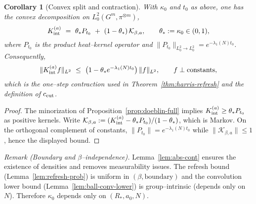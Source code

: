 \documentclass[11pt]{amsart}
\theoremstyle{plain}
\newtheorem{corollary}[theorem]{Corollary}
\theoremstyle{definition}
\theoremstyle{remark}
\begin{document}
\begin{corollary}[Convex split and contraction]\label{cor:convex-split}
With $\kappa_0$ and $t_0$ as above, one has the convex decomposition on $L^2_0(G^m,\pi^{\otimes m})$,
\[
  K_{\rm int}^{(a)}\ =\ \theta_* P_{t_0}\ +\ (1-\theta_*)\,\mathcal{K}_{\beta,a},\qquad \theta_*:=\kappa_0\in(0,1),
\]
where $P_{t_0}$ is the product heat–kernel operator and $\|P_{t_0}\|_{L^2_0\to L^2_0}=e^{-\lambda_1(N) t_0}$. Consequently,
\[
  \|K_{\rm int}^{(a)} f\|_{L^2}\ \le\ \big(1-\theta_* e^{-\lambda_1(N) t_0}\big)\,\|f\|_{L^2},\qquad f\perp \text{constants},
\]
which is the one–step contraction used in Theorem~\ref{thm:harris-refresh} and the definition of $c_{\rm cut}$.
\end{corollary}

\begin{proof}
The minorization of Proposition~\ref{prop:doeblin-full} implies $K_{\rm int}^{(a)}\ge \theta_* P_{t_0}$ as positive kernels. Write $\mathcal{K}_{\beta,a}:=(K_{\rm int}^{(a)}-\theta_* P_{t_0})/(1-\theta_*)$, which is Markov. On the orthogonal complement of constants, $\|P_{t_0}\|=e^{-\lambda_1(N) t_0}$ while $\|\mathcal{K}_{\beta,a}\|\le 1$, hence the displayed bound.
\end{proof}

\noindent\emph{Remark (Boundary and $\beta$–independence).} Lemma~\ref{lem:abs-cont} ensures the existence of densities and removes measurability issues. The refresh bound (Lemma~\ref{lem:refresh-prob}) is uniform in $(\beta,\text{boundary})$ and the convolution lower bound (Lemma~\ref{lem:ball-conv-lower}) is group–intrinsic (depends only on $N$). Therefore $\kappa_0$ depends only on $(R_*,a_0,N)$.
\end{document}
